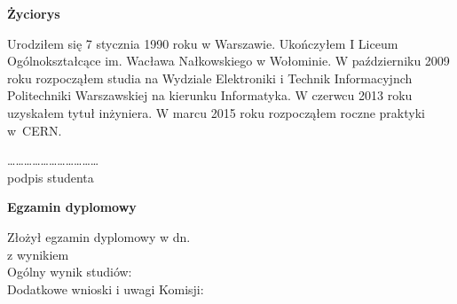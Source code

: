 \vspace{10mm} 

\begin{center}
\textbf{Życiorys}
\end{center}

Urodziłem się 7 stycznia 1990 roku w Warszawie. 
Ukończyłem I Liceum Ogólnokształcące im. Wacława Nałkowskiego w Wołominie.
W październiku 2009 roku rozpocząłem studia na Wydziale Elektroniki i Technik Informacyjnch Politechniki Warszawskiej na kierunku Informatyka. W czerwcu 2013 roku uzyskałem tytuł inżyniera. W marcu 2015 roku rozpocząłem roczne praktyki \mbox{w CERN}. 

	 
\begin{flushright}

\dots\dots\dots\dots\dots\dots\dots\dots\dots\dots\dots \\
    \fontsize{9pt}{9pt}\selectfont
      podpis studenta\hspace{18mm}\null
\end{flushright}

\begin{flushleft}
\begin{center}
\vspace{15mm}
\textbf{Egzamin dyplomowy}
\vspace{5mm} \\
\end{center}

Złożył egzamin dyplomowy w dn. \manydots	 
\vspace{5mm} \\
z wynikiem \manydots 	
\vspace{5mm} \\
Ogólny wynik studiów: \manydots	 
\vspace{5mm} \\
Dodatkowe wnioski i uwagi Komisji: \manydots	 
\manydots \\ 
\vspace{5mm}
\manydots
\end{flushleft}
	
